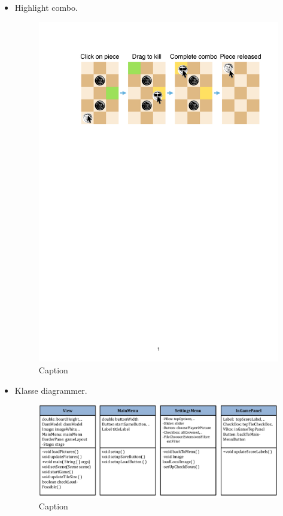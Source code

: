 \begin{itemize}
    \item Highlight combo.
    
    \begin{figure}[H]
        \centering
        \includegraphics[width = \textwidth]{Figurer/ComboFigure}
        \caption{Caption}
        \label{fig:ComboFigure}
    \end{figure}
    
    \item Klasse diagrammer.
    
    \begin{figure}[H]
        \centering
        \includegraphics[width = 0.4  \textwidth]{Figurer/classesView.pdf}
        \caption{Caption}
        \label{fig:classesView}
    \end{figure}
    

\end{itemize}
